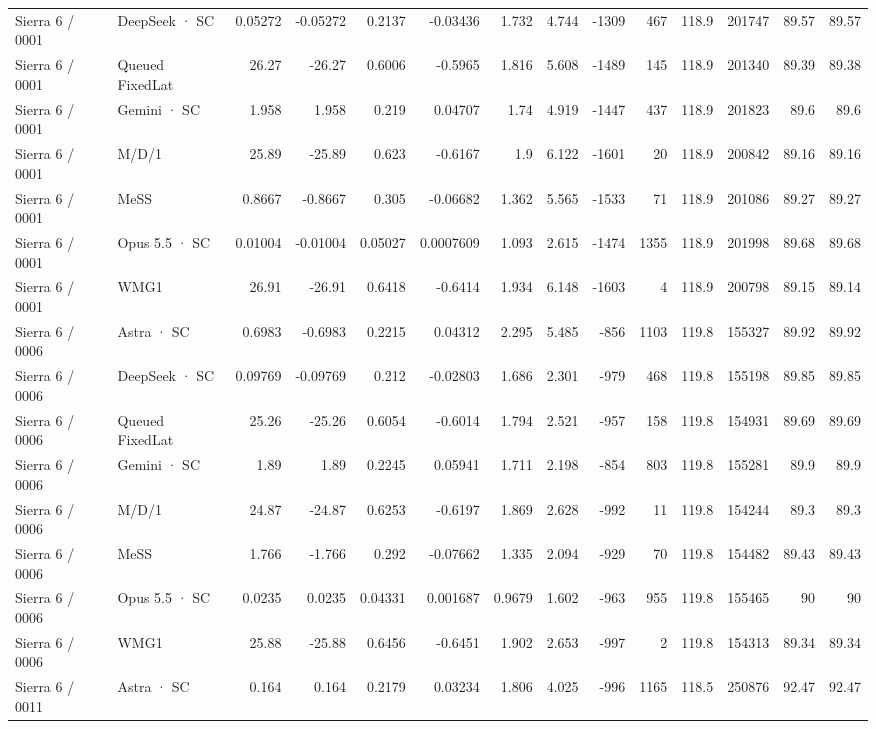 \begin{tabular}{llrrrrrrrrrrrr}
Sierra 6 / 0001 & DeepSeek · SC & 0.05272 & -0.05272 & 0.2137 & -0.03436 & 1.732 & 4.744 & -1309 & 467 & 118.9 & 201747 & 89.57 & 89.57 \\
Sierra 6 / 0001 & Queued FixedLat & 26.27 & -26.27 & 0.6006 & -0.5965 & 1.816 & 5.608 & -1489 & 145 & 118.9 & 201340 & 89.39 & 89.38 \\
Sierra 6 / 0001 & Gemini · SC & 1.958 & 1.958 & 0.219 & 0.04707 & 1.74 & 4.919 & -1447 & 437 & 118.9 & 201823 & 89.6 & 89.6 \\
Sierra 6 / 0001 & M/D/1 & 25.89 & -25.89 & 0.623 & -0.6167 & 1.9 & 6.122 & -1601 & 20 & 118.9 & 200842 & 89.16 & 89.16 \\
Sierra 6 / 0001 & MeSS & 0.8667 & -0.8667 & 0.305 & -0.06682 & 1.362 & 5.565 & -1533 & 71 & 118.9 & 201086 & 89.27 & 89.27 \\
Sierra 6 / 0001 & Opus 5.5 · SC & 0.01004 & -0.01004 & 0.05027 & 0.0007609 & 1.093 & 2.615 & -1474 & 1355 & 118.9 & 201998 & 89.68 & 89.68 \\
Sierra 6 / 0001 & WMG1 & 26.91 & -26.91 & 0.6418 & -0.6414 & 1.934 & 6.148 & -1603 & 4 & 118.9 & 200798 & 89.15 & 89.14 \\
Sierra 6 / 0006 & Astra · SC & 0.6983 & -0.6983 & 0.2215 & 0.04312 & 2.295 & 5.485 & -856 & 1103 & 119.8 & 155327 & 89.92 & 89.92 \\
Sierra 6 / 0006 & DeepSeek · SC & 0.09769 & -0.09769 & 0.212 & -0.02803 & 1.686 & 2.301 & -979 & 468 & 119.8 & 155198 & 89.85 & 89.85 \\
Sierra 6 / 0006 & Queued FixedLat & 25.26 & -25.26 & 0.6054 & -0.6014 & 1.794 & 2.521 & -957 & 158 & 119.8 & 154931 & 89.69 & 89.69 \\
Sierra 6 / 0006 & Gemini · SC & 1.89 & 1.89 & 0.2245 & 0.05941 & 1.711 & 2.198 & -854 & 803 & 119.8 & 155281 & 89.9 & 89.9 \\
Sierra 6 / 0006 & M/D/1 & 24.87 & -24.87 & 0.6253 & -0.6197 & 1.869 & 2.628 & -992 & 11 & 119.8 & 154244 & 89.3 & 89.3 \\
Sierra 6 / 0006 & MeSS & 1.766 & -1.766 & 0.292 & -0.07662 & 1.335 & 2.094 & -929 & 70 & 119.8 & 154482 & 89.43 & 89.43 \\
Sierra 6 / 0006 & Opus 5.5 · SC & 0.0235 & 0.0235 & 0.04331 & 0.001687 & 0.9679 & 1.602 & -963 & 955 & 119.8 & 155465 & 90 & 90 \\
Sierra 6 / 0006 & WMG1 & 25.88 & -25.88 & 0.6456 & -0.6451 & 1.902 & 2.653 & -997 & 2 & 119.8 & 154313 & 89.34 & 89.34 \\
Sierra 6 / 0011 & Astra · SC & 0.164 & 0.164 & 0.2179 & 0.03234 & 1.806 & 4.025 & -996 & 1165 & 118.5 & 250876 & 92.47 & 92.47 \\

\end{tabular}
